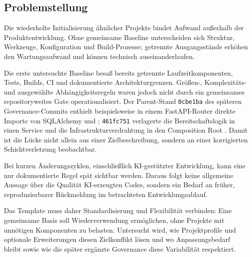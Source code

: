\subsection{Problemstellung}
\label{subsec:problemstellung}

Die wiederholte Initialisierung ähnlicher Projekte bindet Aufwand außerhalb der
Produktentwicklung. Ohne gemeinsame Baseline unterscheiden sich Struktur,
Werkzeuge, Konfiguration und Build-Prozesse; getrennte Ausgangsstände erhöhen
den Wartungsaufwand und können technisch auseinanderlaufen.

Die erste untersuchte Baseline besaß bereits getrennte Laufzeitkomponenten,
Tests, Builds, CI und dokumentierte Architekturgrenzen. Größen-,
Komplexitäts- und ausgewählte Abhängigkeitsregeln waren jedoch nicht durch ein
gemeinsames repositoryweites Gate operationalisiert. Der Parent-Stand
\texttt{0cbe1ba} des späteren Governance-Commits enthielt beispielsweise in
einem FastAPI-Router direkte Importe von SQLAlchemy und ;
\texttt{461fc751} verlagerte die Bereitschaftslogik in einen Service und die
Infrastrukturverdrahtung in den Composition Root
\parencite{kleiveist2026governance-commit}. Damit ist die Lücke nicht allein
aus einer Zielbeschreibung, sondern an einer korrigierten Schichtverletzung
beobachtbar.

Bei kurzen Änderungszyklen, einschließlich KI-gestützter Entwicklung, kann
eine nur dokumentierte Regel spät sichtbar werden. Daraus folgt keine
allgemeine Aussage über die Qualität KI-erzeugten Codes, sondern ein Bedarf an
früher, reproduzierbarer Rückmeldung im betrachteten Entwicklungsablauf.

Das Template muss daher Standardisierung und Flexibilität verbinden: Eine
gemeinsame Basis soll Wiederverwendung ermöglichen, ohne Projekte mit
unnötigen Komponenten zu belasten. Untersucht wird, wie Projektprofile und
optionale Erweiterungen diesen Zielkonflikt lösen und wo Anpassungsbedarf bleibt
\parencite{kleiveist2026architecture,kleiveist2026profiles} sowie wie die
später ergänzte Governance diese Variabilität respektiert.
